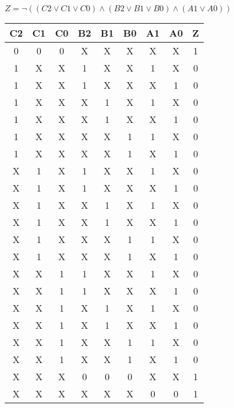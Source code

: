\begin{center}
    {\(Z = \lnot ((C2 \lor C1 \lor C0) \land (B2 \lor B1 \lor B0) \land (A1 \lor A0)) \)}
    \begin{table}[h] %
        \begin{center}
            \begin{tabular}{|c|c|c|c|c|c|c|c||c|} \hline
            C2 & C1 & C0 & B2 & B1 & B0 & A1 & A0 & Z \\ \hline\hline
            0  & 0  & 0  & X  & X  & X  & X  & X  & 1 \\ \hline
            1  & X  & X  & 1  & X  & X  & 1  & X  & 0 \\ \hline
            1  & X  & X  & 1  & X  & X  & X  & 1  & 0 \\ \hline
            1  & X  & X  & X  & 1  & X  & 1  & X  & 0 \\ \hline
            1  & X  & X  & X  & 1  & X  & X  & 1  & 0 \\ \hline
            1  & X  & X  & X  & X  & 1  & 1  & X  & 0 \\ \hline
            1  & X  & X  & X  & X  & 1  & X  & 1  & 0 \\ \hline
            X  & 1  & X  & 1  & X  & X  & 1  & X  & 0 \\ \hline
            X  & 1  & X  & 1  & X  & X  & X  & 1  & 0 \\ \hline
            X  & 1  & X  & X  & 1  & X  & 1  & X  & 0 \\ \hline
            X  & 1  & X  & X  & 1  & X  & X  & 1  & 0 \\ \hline
            X  & 1  & X  & X  & X  & 1  & 1  & X  & 0 \\ \hline
            X  & 1  & X  & X  & X  & 1  & X  & 1  & 0 \\ \hline
            X  & X  & 1  & 1  & X  & X  & 1  & X  & 0 \\ \hline
            X  & X  & 1  & 1  & X  & X  & X  & 1  & 0 \\ \hline
            X  & X  & 1  & X  & 1  & X  & 1  & X  & 0 \\ \hline
            X  & X  & 1  & X  & 1  & X  & X  & 1  & 0 \\ \hline
            X  & X  & 1  & X  & X  & 1  & 1  & X  & 0 \\ \hline
            X  & X  & 1  & X  & X  & 1  & X  & 1  & 0 \\ \hline
            X  & X  & X  & 0  & 0  & 0  & X  & X  & 1 \\ \hline
            X  & X  & X  & X  & X  & X  & 0  & 0  & 1 \\ \hline
            \end{tabular}
        \end{center}
    \end{table}
\end{center}
